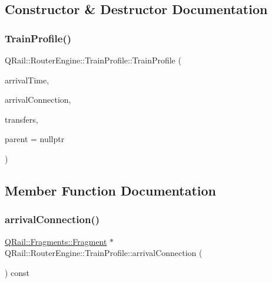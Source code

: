 \subsection{Constructor \& Destructor Documentation}
\mbox{\label{classQRail_1_1RouterEngine_1_1TrainProfile_abe75e954492d6329b4afbcf8b7401cb3}} 
\subsubsection{\texorpdfstring{TrainProfile()}{TrainProfile()}}
{\footnotesize\ttfamily Q\+Rail\+::\+Router\+Engine\+::\+Train\+Profile\+::\+Train\+Profile (\begin{DoxyParamCaption}\item[{const Q\+Date\+Time \&}]{arrival\+Time,  }\item[{\mbox{\hyperlink{classQRail_1_1Fragments_1_1Fragment}{Q\+Rail\+::\+Fragments\+::\+Fragment}} $\ast$}]{arrival\+Connection,  }\item[{const qint16}]{transfers,  }\item[{Q\+Object $\ast$}]{parent = {\ttfamily nullptr} }\end{DoxyParamCaption})\hspace{0.3cm}{\ttfamily [explicit]}}



\subsection{Member Function Documentation}
\mbox{\label{classQRail_1_1RouterEngine_1_1TrainProfile_ad1c7f00267cf53ec8f53c9550365eb22}} 
\subsubsection{\texorpdfstring{arrivalConnection()}{arrivalConnection()}}
{\footnotesize\ttfamily \mbox{\hyperlink{classQRail_1_1Fragments_1_1Fragment}{Q\+Rail\+::\+Fragments\+::\+Fragment}} $\ast$ Q\+Rail\+::\+Router\+Engine\+::\+Train\+Profile\+::arrival\+Connection (\begin{DoxyParamCaption}{ }\end{DoxyParamCaption}) const}

